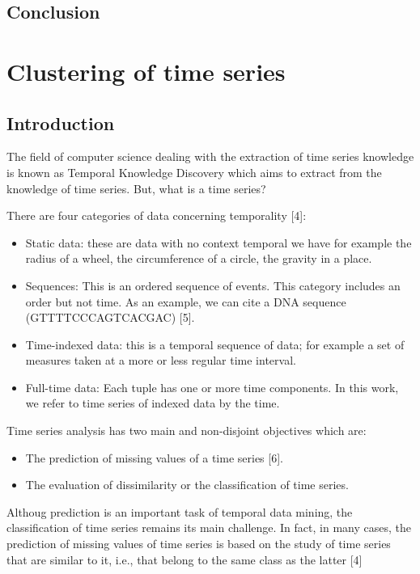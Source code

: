 \section{Conclusion}









\chapter{Clustering of time series}

\section{Introduction}
The field of computer science dealing with the extraction of time series knowledge is known as Temporal Knowledge Discovery  which aims to extract from the knowledge of time series. But, what is a time series?

There are four categories of data concerning temporality [4]:
\begin{itemize}
\item Static data: these are data with no context
temporal we have for example the radius of a wheel, the circumference of a circle, the gravity in a place.
\item Sequences: This is an ordered sequence of events. This category includes an order but not time. As an example, we can cite a DNA sequence (GTTTTCCCAGTCACGAC) [5].
\item Time-indexed data: this is a temporal sequence of data; for example a set of measures taken at a more or less regular time interval.
\item Full-time data: Each tuple has one or more time components. In this work, we refer to time series of indexed data by the time.
\end{itemize}


Time series analysis has two main and non-disjoint objectives which are:

\begin{itemize}
\item The prediction of missing values of a time series [6].
\item The evaluation of dissimilarity or the classification of time series.
\end{itemize}

Althoug prediction is an important task of temporal data mining, the classification of time series remains its main challenge. In fact, in many cases, the prediction of missing values of time series is based on the study of time series that are similar to it, i.e., that belong to the same class as the latter [4]


